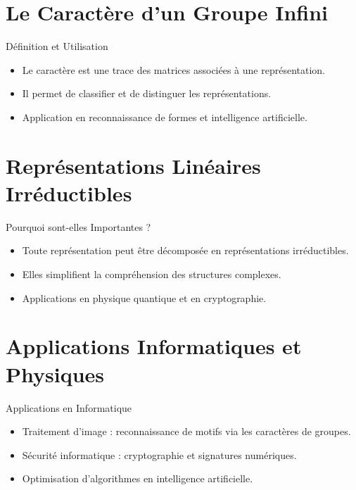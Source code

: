 \documentclass[french]{beamer}
\begin{document}
	\section{Le Caractère d’un Groupe Infini}
	\begin{frame}{Définition et Utilisation}
		\begin{itemize}
			\item Le caractère est une trace des matrices associées à une représentation.
			\item Il permet de classifier et de distinguer les représentations.
			\item Application en reconnaissance de formes et intelligence artificielle.
		\end{itemize}
	\end{frame}
	
	\section{Représentations Linéaires Irréductibles}
	\begin{frame}{Pourquoi sont-elles Importantes ?}
		\begin{itemize}
			\item Toute représentation peut être décomposée en représentations irréductibles.
			\item Elles simplifient la compréhension des structures complexes.
			\item Applications en physique quantique et en cryptographie.
		\end{itemize}
	\end{frame}
	
	\section{Applications Informatiques et Physiques}
	\begin{frame}{Applications en Informatique}
		\begin{itemize}
			\item Traitement d’image : reconnaissance de motifs via les caractères de groupes.
			\item Sécurité informatique : cryptographie et signatures numériques.
			\item Optimisation d’algorithmes en intelligence artificielle.
		\end{itemize}
	\end{frame}
	
\end{document}
